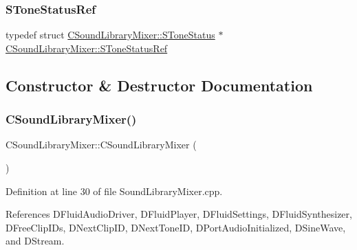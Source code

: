 \hypertarget{classCSoundLibraryMixer_ad772f44e33c3fce7e970b5057bdf81b9}{}\label{classCSoundLibraryMixer_ad772f44e33c3fce7e970b5057bdf81b9} 
\subsubsection{\texorpdfstring{S\+Tone\+Status\+Ref}{SToneStatusRef}}
{\footnotesize\ttfamily typedef  struct \hyperlink{structCSoundLibraryMixer_1_1SToneStatus}{C\+Sound\+Library\+Mixer\+::\+S\+Tone\+Status} $\ast$ \hyperlink{classCSoundLibraryMixer_ad772f44e33c3fce7e970b5057bdf81b9}{C\+Sound\+Library\+Mixer\+::\+S\+Tone\+Status\+Ref}\hspace{0.3cm}{\ttfamily [protected]}}



\subsection{Constructor \& Destructor Documentation}
\hypertarget{classCSoundLibraryMixer_a555dc21fe5bd397e09b524c5f0975a08}{}\label{classCSoundLibraryMixer_a555dc21fe5bd397e09b524c5f0975a08} 
\subsubsection{\texorpdfstring{C\+Sound\+Library\+Mixer()}{CSoundLibraryMixer()}}
{\footnotesize\ttfamily C\+Sound\+Library\+Mixer\+::\+C\+Sound\+Library\+Mixer (\begin{DoxyParamCaption}{ }\end{DoxyParamCaption})}



Definition at line 30 of file Sound\+Library\+Mixer.\+cpp.



References D\+Fluid\+Audio\+Driver, D\+Fluid\+Player, D\+Fluid\+Settings, D\+Fluid\+Synthesizer, D\+Free\+Clip\+I\+Ds, D\+Next\+Clip\+ID, D\+Next\+Tone\+ID, D\+Port\+Audio\+Initialized, D\+Sine\+Wave, and D\+Stream.


